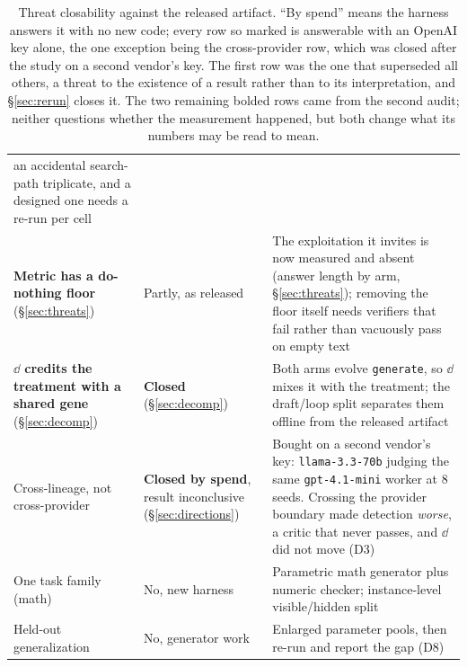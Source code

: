 \documentclass[11pt]{article}
\begin{document}
\begin{table}[h]
\begin{tabular}{p{}p{}p{}}
  an accidental search-path triplicate, and a designed one needs a re-run per cell \\
\textbf{Metric has a do-nothing floor} (\S\ref{sec:threats}) & Partly, as released &
  The exploitation it invites is now measured and absent (answer length by arm,
  \S\ref{sec:threats}); removing the floor itself needs verifiers that fail rather than
  vacuously pass on empty text \\
\textbf{$\dd$ credits the treatment with a shared gene} (\S\ref{sec:decomp}) & \textbf{Closed}
  (\S\ref{sec:decomp}) & Both arms evolve \texttt{generate}, so $\dd$ mixes it with the
  treatment; the draft/loop split separates them offline from the released artifact \\
Cross-lineage, not cross-provider & \textbf{Closed by spend}, result inconclusive
  (\S\ref{sec:directions}) & Bought on a
  second vendor's key: \texttt{llama-3.3-70b} judging the same \texttt{gpt-4.1-mini} worker at
  $8$ seeds. Crossing the provider boundary made detection \emph{worse}, a critic that never
  passes, and $\dd$ did not move (D3) \\
One task family (math) & No, new harness & Parametric math generator plus numeric checker;
  instance-level visible/hidden split \\
Held-out generalization & No, generator work & Enlarged parameter pools, then re-run and
  report the gap (D8) \\
\bottomrule
\end{tabular}
\caption{Threat closability against the released artifact. ``By
spend'' means the harness answers it with no new code; every row so marked is answerable with an
OpenAI key alone, the one exception being the cross-provider row, which was closed after the
study on a second vendor's key. The first row was the one that
superseded all others, a threat to the existence of a result rather than to its
interpretation, and \S\ref{sec:rerun} closes it. The two remaining bolded rows came from
the second audit; neither questions whether the measurement happened, but both change what
its numbers may be read to mean.}
\label{tab:closability}
\end{table}
\end{document}
